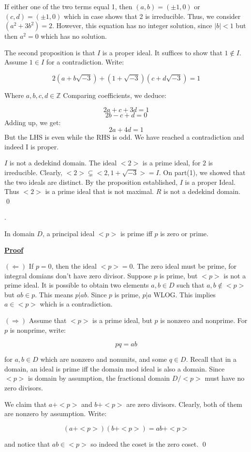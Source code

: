 \documentclass{article}
\newcounter{problemcnt}
\newcommand{\Problem}{{
    \vspace{5mm}
    \stepcounter{problemcnt}
    \noindent
    \arabic{problemcnt}. 
}
}
\newcommand{\Proof}{{
    \vspace{2mm}
    \noindent
    \textbf{
    \underline{Proof}}
}
}
\begin{document}
If either one of the two terms equal 1, 
then $(a, b) = (\pm1, 0)$ 
or $(c, d) = (\pm1, 0)$
which in case shows that 2 is irreducible. 
Thus, we consider 
$(a^2+3b^2) = 2$. 
However, this equation has no integer solution,
since $|b| < 1$ but then $a^2 = 0$ which has 
no solution. 

The second proposition is that $I$ is 
a proper ideal. It suffices to show 
that $1 \notin I$. Assume $1 \in I$ 
for a contradiction. Write:

\[
    2(a+b\sqrt{-3})+(1+\sqrt{-3})
    (c+d\sqrt{-3}) = 1
\]

Where $a, b, c, d \in \mathbb{Z}$
Comparing coefficients, we deduce:

\[
    2a+c+3d = 1
\]
\[
    2b-c+d = 0
\]
Adding up, we get:
\[
    2a+4d = 1
\]
But the LHS is even while the RHS is odd. We 
have reached a contradiction and indeed I is proper. 

$I$ is not a dedekind domain. The ideal 
$<2>$ is a prime ideal, for $2$ is irreducible. 
Clearly, $<2> \subsetneq <2, 1+\sqrt{-3}> = I$. 
On part(1), we showed that the two ideals are 
distinct. By the proposition established, $I$ 
is a proper Ideal. Thus $<2>$ is a prime ideal 
that is not maximal. $R$ is not a dedekind domain. 
\qed



\Problem
In domain $D$, a principal ideal $<p>$ 
is prime iff $p$ is zero or prime. 

\Proof
$(\Leftarrow)$
If $p = 0$, then the ideal $<p> = {0}$. 
The zero ideal must be prime, for integral 
domians don't have zero divisor. Suppose 
$p$ is prime, but $<p>$ is not a prime ideal. 
It is possible to obtain two elements $a, b \in D$
such that $a, b \notin <p>$ but $ab \in p$.
This means $p|ab$.  
Since $p$ is prime, $p|a$ WLOG. 
This implies $a \in <p>$ which is a contradiction. 

$(\Rightarrow)$
Assume that $<p>$ is a prime ideal, but 
$p$ is nonzero and nonprime. For $p$ is 
nonprime, write:

\[
    pq = ab
\]

for $a, b\in D$ which are nonzero and nonunits, and some 
$q \in D$. Recall that in a domain, 
an ideal is prime iff the domain mod 
ideal is also a domain. Since $<p>$ is 
domain by assumption, the fractional 
domain $D/<p>$ must have no zero divisors. 

We claim that $a + <p>$ and $b+<p>$ are 
zero divisors. Clearly, both of them are 
nonzero by assumption. Write:

\[(a+<p>)(b+<p>) = ab+<p>\]

and notice that $ab\in <p>$ so indeed 
the coset is the zero coset. \qed
\end{document}
